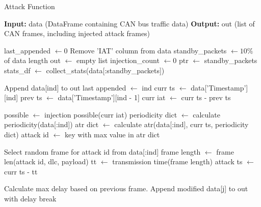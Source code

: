 \documentclass{article}
\begin{document}
\begin{algorithm}
    \caption{Attack Function}
    \label{alg:attack}
    \begin{algorithmic}[1]
    \State \textbf{Input:} data (DataFrame containing CAN bus traffic data)
    \State \textbf{Output:} out (list of CAN frames, including injected attack frames)
    
    \State last\_appended $\gets 0$
    \State Remove 'IAT' column from data
    \State standby\_packets $\gets 10\%$ of data length
    \State out $\gets$ empty list
    \State injection\_count $\gets 0$
    \State ptr $\gets$ standby\_packets
    \State stats\_df $\gets$ collect\_stats(data[:standby\_packets])
    
            \State Append data[ind] to out
            \State last appended $\gets$ ind
        \Else
            \State curr ts $\gets$ data['Timestamp'][ind]
            \State prev ts $\gets$ data['Timestamp'][ind - 1]
            \State curr iat $\gets$ curr ts - prev ts
    
            \State possible $\gets$ injection possible(curr iat)
                \State periodicity dict $\gets$ calculate periodicity(data[:ind])
                \State atr dict $\gets$ calculate atr(data[:ind], curr ts, periodicity dict)
                \State attack id $\gets$ key with max value in atr dict
    
                \State Select random frame for attack id from data[:ind]
                \State frame length $\gets$ frame len(attack id, dlc, payload)
                \State tt $\gets$ transmission time(frame length)
                \State attack ts $\gets$ curr ts - tt
    
                    \State Calculate max delay based on previous frame.
                        \State Append modified data[j] to out with delay
                            \State break
                        \EndIf
    

\end{algorithmic}
\end{algorithm}
\end{document}
